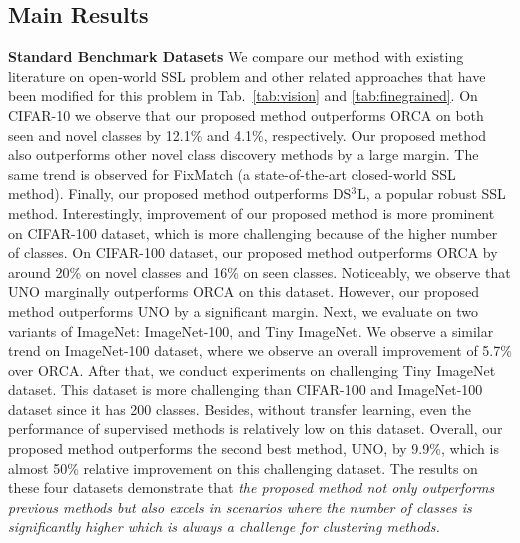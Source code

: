 \documentclass[runningheads]{eccv2022submission}
\begin{document}
\subsection{Main Results}
\noindent \textbf{Standard Benchmark Datasets}
We compare our method with existing literature on open-world SSL problem \cite{cao2022openworld} and other related approaches that have been modified for this problem in Tab.~\ref{tab:vision} and \ref{tab:finegrained}. On CIFAR-10 we observe that our proposed method outperforms ORCA \cite{cao2022openworld} on both seen and novel classes by 12.1\% and 4.1\%, respectively. Our proposed method also outperforms other novel class discovery methods \cite{han2019learning,Han2020Automatically,fini2021unified} by a large margin. The same trend is observed for FixMatch \cite{sohn2020fixmatch} (a state-of-the-art closed-world SSL method). Finally, our proposed method outperforms DS$^3$L\cite{guo2020safe}, a popular robust SSL method. Interestingly, improvement of our proposed method is more prominent on CIFAR-100 dataset, which is more challenging because of the higher number of classes. On CIFAR-100 dataset, our proposed method outperforms ORCA by around 20\% on novel classes and 16\% on seen classes. Noticeably, we observe that UNO\cite{fini2021unified} marginally outperforms ORCA on this dataset. However, our proposed method outperforms UNO by a significant margin. Next, we evaluate on two variants of ImageNet: ImageNet-100, and Tiny ImageNet. We observe a similar trend on ImageNet-100 dataset, where we observe an overall improvement of 5.7\% over ORCA. After that, we conduct experiments on challenging Tiny ImageNet dataset. This dataset is more challenging than CIFAR-100 and ImageNet-100 dataset since it has 200 classes. Besides, without transfer learning, even the performance of supervised methods is relatively low on this dataset. Overall, our proposed method outperforms the second best method, UNO, by 9.9\%, which is almost 50\% relative improvement on this challenging dataset. The results on these four datasets demonstrate that \emph{the proposed method not only outperforms previous methods but also excels in scenarios where the number of classes is significantly higher which is always a challenge for clustering methods.}   
\end{document}
